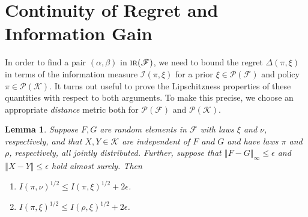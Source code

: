 \documentclass[letter, 12pt]{report}
\newcommand{\norm}[1]{\left \Vert  #1 \right \Vert}
\newcommand{\cK}{\mathcal K}
\newcommand{\sF}{\mathscr F}
\newcommand{\cI}{\mathcal I}
\newcommand{\sP}{\mathscr P}
\newcommand{\1}{\mathbf{1}}
\newcommand{\IR}{\operatorname{\textsc{ir}}}
\theoremstyle{plain}
\newtheorem{lemma}[theorem]{Lemma}
\theoremstyle{definition}
\theoremstyle{remark}
\begin{document}
\section{Continuity of Regret and Information Gain}
In order to find a pair $(\alpha, \beta)$ in $\IR(\sF)$, we need to bound the regret $\Delta(\pi, \xi)$ in terms of the information measure $\cI(\pi, \xi)$ for a prior $\xi \in \sP(\sF)$ and policy $\pi \in \sP(\cK)$.
It turns out useful to prove the Lipschitzness properties of these quantities with respect to both arguments.
To make this precise, we choose an appropriate \textit{distance} metric both for $\sP(\sF)$ and $\sP(\cK)$.
\begin{lemma}\label{lem:cont:I}
    Suppose $F, G$ are random elements in $\sF$ with laws $\xi$ and $\nu$, respectively,
    and that $X, Y \in \cK$ are independent of $F$ and $G$ and have laws $\pi$ and $\rho$, respectively, all jointly distributed.
    Further, suppose that
    $\norm{F - G}_\infty \leq \epsilon$ and $\norm{X - Y} \leq \epsilon$ hold almost surely.
    Then
    \begin{enumerate}
        \item $I(\pi, \nu)^{1/2} \leq I(\pi, \xi)^{1/2} + 2\epsilon$.
        \item $I(\pi, \xi)^{1/2} \leq I(\rho, \xi)^{1/2} + 2\epsilon$.
    \end{enumerate}
\end{lemma}
\end{document}
